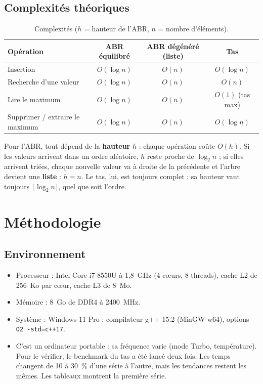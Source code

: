 \documentclass[12pt,a4paper]{report}
\begin{document}
\section{Complexités théoriques}
\begin{table}[H]
\centering
\caption{Complexités ($h$ = hauteur de l'ABR, $n$ = nombre d'éléments).}
\small
\begin{tabular}{lccc}
  \toprule
  Opération & ABR équilibré & ABR dégénéré (liste) & Tas \\
  \midrule
  Insertion & $O(\log n)$ & $O(n)$ & $O(\log n)$ \\
  Recherche d'une valeur & $O(\log n)$ & $O(n)$ & $O(n)$ \\
  Lire le maximum & $O(\log n)$ & $O(n)$ & $O(1)$ (tas max) \\
  Supprimer / extraire le maximum & $O(\log n)$ & $O(n)$ & $O(\log n)$ \\
  \bottomrule
\end{tabular}
\end{table}
Pour l'ABR, tout dépend de la \textbf{hauteur} $h$ : chaque opération coûte $O(h)$. Si les valeurs arrivent dans un ordre aléatoire, $h$ reste proche de $\log_2 n$ ; si elles arrivent triées, chaque nouvelle valeur va à droite de la précédente et l'arbre devient une \textbf{liste} : $h = n$. Le tas, lui, est toujours complet : sa hauteur vaut toujours $\lfloor\log_2 n\rfloor$, quel que soit l'ordre.

\chapter{Méthodologie}

\section{Environnement}
\begin{itemize}
  \item Processeur : Intel Core i7-8550U à 1,8~GHz (4 cœurs, 8 threads), cache L2 de 256~Ko par cœur, cache L3 de 8~Mo.
  \item Mémoire : 8~Go de DDR4 à 2400~MHz.
  \item Système : Windows 11 Pro ; compilateur g++ 15.2 (MinGW-w64), options \texttt{-O2 -std=c++17}.
  \item C'est un ordinateur portable : sa fréquence varie (mode Turbo, température). Pour le vérifier, le benchmark du tas a été lancé deux fois. Les temps changent de 10 à 30~\% d'une série à l'autre, mais les tendances restent les mêmes. Les tableaux montrent la première série.
\end{itemize}
\end{document}
